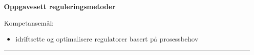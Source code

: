 \begin{center}
\LARGE
\centerline\textbf{Oppgavesett reguleringsmetoder}
\end{center}
\normalsize

\vskip 2cm 
Kompetansemål:
\begin{itemize}[noitemsep]
	\item idriftsette og optimalisere regulatorer basert på prosessbehov
\end{itemize}
\bigskip 
\hrule
\vfil \eject
